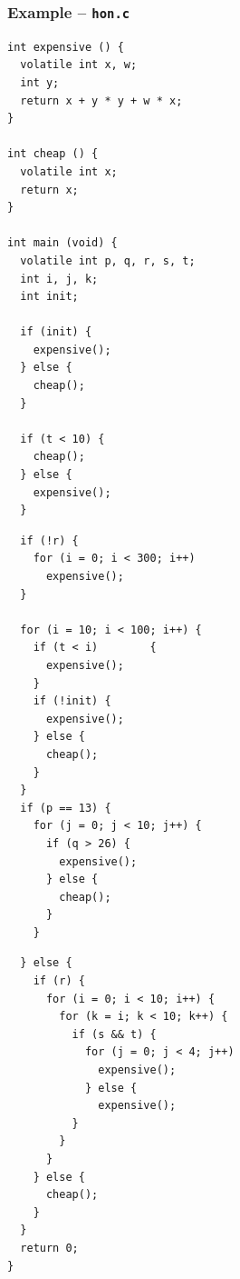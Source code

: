 \documentclass{beamer}
\begin{document}
\begin{frame}[fragile]
  \frametitle{Example -- {\tt hon.c}}
  {\tiny
  \begin{minipage}[t]{0.31\textwidth}
  \begin{verbatim}
int expensive () {
  volatile int x, w;
  int y;
  return x + y * y + w * x;
}

int cheap () {
  volatile int x;
  return x;
}

int main (void) {
  volatile int p, q, r, s, t;
  int i, j, k;
  int init;

  if (init) {
    expensive(); 
  } else {
    cheap();
  }

  if (t < 10) {
    cheap();
  } else {
    expensive();
  }
  \end{verbatim}
  \end{minipage}
  \begin{minipage}[t]{0.32\textwidth}
  \begin{verbatim}
  if (!r) {
    for (i = 0; i < 300; i++) 
      expensive();
  }

  for (i = 10; i < 100; i++) {
    if (t < i)        {
      expensive();
    }
    if (!init) {
      expensive();
    } else {
      cheap();
    }
  }
  if (p == 13) {
    for (j = 0; j < 10; j++) {
      if (q > 26) {
        expensive();
      } else {
        cheap();
      }
    }
  \end{verbatim}
  \end{minipage}
  \begin{minipage}[t]{0.32\textwidth}
  \begin{verbatim}
  } else {
    if (r) {
      for (i = 0; i < 10; i++) {
        for (k = i; k < 10; k++) {
          if (s && t) {
            for (j = 0; j < 4; j++)
              expensive();
            } else {
              expensive();
          }
        }
      }
    } else {
      cheap();
    }
  } 
  return 0;
}
  \end{verbatim}
  \end{minipage}
  }
\end{frame}
\end{document}
